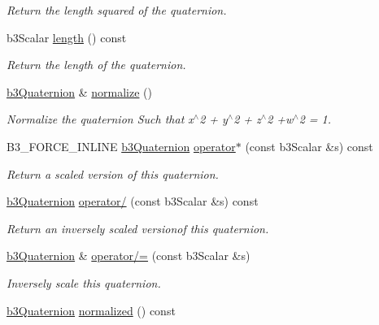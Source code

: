 \begin{CompactItemize}
\begin{CompactList}\small\item\em Return the length squared of the quaternion. \item\end{CompactList}\item 
\hypertarget{classb3_quaternion_d008f8dd2f6dbd5ac86f3b02a10ef4a6}{
b3Scalar \hyperlink{classb3_quaternion_d008f8dd2f6dbd5ac86f3b02a10ef4a6}{length} () const }
\label{classb3_quaternion_d008f8dd2f6dbd5ac86f3b02a10ef4a6}

\begin{CompactList}\small\item\em Return the length of the quaternion. \item\end{CompactList}\item 
\hypertarget{classb3_quaternion_96d3f4aedcb4b645115ab5a7897fa0d1}{
\hyperlink{classb3_quaternion}{b3Quaternion} \& \hyperlink{classb3_quaternion_96d3f4aedcb4b645115ab5a7897fa0d1}{normalize} ()}
\label{classb3_quaternion_96d3f4aedcb4b645115ab5a7897fa0d1}

\begin{CompactList}\small\item\em Normalize the quaternion Such that x$^\wedge$2 + y$^\wedge$2 + z$^\wedge$2 +w$^\wedge$2 = 1. \item\end{CompactList}\item 
B3\_\-FORCE\_\-INLINE \hyperlink{classb3_quaternion}{b3Quaternion} \hyperlink{classb3_quaternion_ad2b1b2ec07bc16942c47eb5c7750016}{operator$\ast$} (const b3Scalar \&s) const 
\begin{CompactList}\small\item\em Return a scaled version of this quaternion. \item\end{CompactList}\item 
\hyperlink{classb3_quaternion}{b3Quaternion} \hyperlink{classb3_quaternion_4774d113abff51d66af8cf4da7cccc26}{operator/} (const b3Scalar \&s) const 
\begin{CompactList}\small\item\em Return an inversely scaled versionof this quaternion. \item\end{CompactList}\item 
\hyperlink{classb3_quaternion}{b3Quaternion} \& \hyperlink{classb3_quaternion_293d5a2d8e103d5577a83baa18d4b2b7}{operator/=} (const b3Scalar \&s)
\begin{CompactList}\small\item\em Inversely scale this quaternion. \item\end{CompactList}\item 
\hypertarget{classb3_quaternion_91d2ea964b6c93fc2c61cc678610bd8f}{
\hyperlink{classb3_quaternion}{b3Quaternion} \hyperlink{classb3_quaternion_91d2ea964b6c93fc2c61cc678610bd8f}{normalized} () const }
\label{classb3_quaternion_91d2ea964b6c93fc2c61cc678610bd8f}


\end{CompactItemize}
